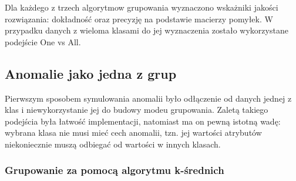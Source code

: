 \documentclass[11pt,a4paper,twoside]{article}
\begin{document}
Dla każdego z trzech algorytmow grupowania wyznaczono wskażniki jakości rozwiązania: dokładność oraz precyzję na podstawie macierzy pomyłek. W przypadku danych z wieloma klasami do jej wyznaczenia zostało wykorzystane podejście One vs All.


\subsection {Anomalie jako jedna z grup}

Pierwszym sposobem symulowania anomalii było odłączenie od danych jednej z klas i niewykorzystanie jej do budowy modeu grupowania. Zaletą takiego podejścia była łatwość implementacji, natomiast ma on pewną istotną wadę: wybrana klasa nie musi mieć cech anomalii, tzn. jej wartości atrybutów niekoniecznie muszą odbiegać od wartości w innych klasach.


\subsubsection{Grupowanie za pomocą algorytmu k-średnich }

\end{document}
